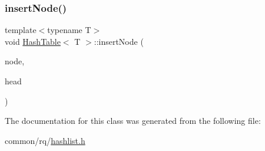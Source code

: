\mbox{\label{classHashTable_a6305be5a3ca8a048a64b32e6dc5067f3}} 
\subsubsection{\texorpdfstring{insert\+Node()}{insertNode()}}
{\footnotesize\ttfamily template$<$typename T$>$ \\
void \hyperlink{classHashTable}{Hash\+Table}$<$ T $>$\+::insert\+Node (\begin{DoxyParamCaption}\item[{\hyperlink{classHLNode}{H\+L\+Node}$<$ T $>$ $\ast$}]{node,  }\item[{\hyperlink{classHLNode}{H\+L\+Node}$<$ T $>$ $\ast$}]{head }\end{DoxyParamCaption})\hspace{0.3cm}{\ttfamily [inline]}}



The documentation for this class was generated from the following file\+:\begin{DoxyCompactItemize}
\item 
common/rq/\hyperlink{hashlist_8h}{hashlist.\+h}\end{DoxyCompactItemize}
